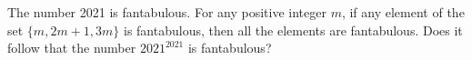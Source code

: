 The number 2021 is fantabulous.
For any positive integer $m$, if any element of the set $\{m, 2m+1, 3m\}$ is fantabulous, then all the elements are fantabulous.
Does it follow that the number $2021^{2021}$ is fantabulous?
